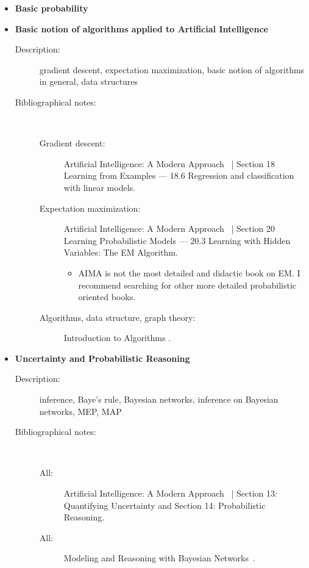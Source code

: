 \documentclass[a4paper,10pt]{article}
\theoremstyle{plain}
\begin{document}
\begin{appendices}
\begin{itemize}
  \item \textbf{Basic probability}
  \item \textbf{Basic notion of algorithms applied to Artificial Intelligence}
    \begin{description}
      \item[Description:] gradient descent, expectation maximization, basic notion of algorithms in
        general, data structures
      \item[Bibliographical notes:]\ \
        \begin{description}
          \item[Gradient descent:] Artificial Intelligence: A Modern Approach~\cite{aima} | Section
            18 Learning from Examples --- 18.6 Regression and classification with linear models.
          \item[Expectation maximization:] Artificial Intelligence: A Modern Approach~\cite{aima} |
            Section 20 Learning Probabilistic Models --- 20.3 Learning with Hidden Variables: The
            EM Algorithm.
            \begin{itemize}
              \item AIMA is not the most detailed and didactic book on EM\@. I recommend searching
                for other more detailed probabilistic oriented books.
            \end{itemize}
          \item[Algorithms, data structure, graph theory:] Introduction to Algorithms
            \cite{algorithms}.
        \end{description}
    \end{description}
  \item \textbf{Uncertainty and Probabilistic Reasoning}
    \begin{description}
      \item[Description:] inference, Baye's rule, Bayesian networks, inference on Bayesian
        networks, MEP, MAP
      \item[Bibliographical notes:]\ \
        \begin{description}
          \item[All:] Artificial Intelligence: A Modern Approach~\cite{aima} | Section 13:
            Quantifying Uncertainty and Section 14: Probabilistic Reasoning.
          \item[All:] Modeling and Reasoning with Bayesian Networks~\cite{bayes-net-darwiche}.
        \end{description}

\end{description}
\end{itemize}
\end{appendices}
\end{document}
